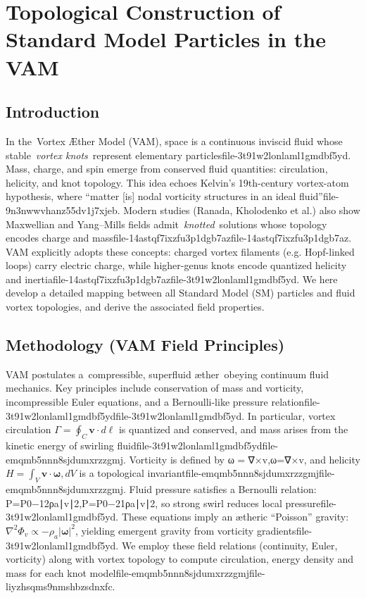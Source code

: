 \documentclass[a4paper,12pt]{article}
\begin{document}
\chapter*{Topological Construction of Standard Model Particles in the VAM}
\section*{Introduction}
In the Vortex Æther Model (VAM), space is a continuous inviscid fluid whose stable \textit{vortex knots} represent elementary particlesfile-3t91w2lonlaml1gmdbf5yd. Mass, charge, and spin emerge from conserved fluid quantities: circulation, helicity, and knot topology. This idea echoes Kelvin’s 19th-century vortex-atom hypothesis, where “matter [is] nodal vorticity structures in an ideal fluid”file-9n3nwwvhanz55dv1j7xjeb. Modern studies (Ranada, Kholodenko et al.) also show Maxwellian and Yang–Mills fields admit \textit{knotted} solutions whose topology encodes charge and massfile-14astqf7ixzfu3p1dgb7azfile-14astqf7ixzfu3p1dgb7az. VAM explicitly adopts these concepts: charged vortex filaments (e.g. Hopf-linked loops) carry electric charge, while higher-genus knots encode quantized helicity and inertiafile-14astqf7ixzfu3p1dgb7azfile-3t91w2lonlaml1gmdbf5yd. We here develop a detailed mapping between all Standard Model (SM) particles and fluid vortex topologies, and derive the associated field properties.

\section*{Methodology (VAM Field Principles)}
VAM postulates a compressible, superfluid æther obeying continuum fluid mechanics. Key principles include conservation of mass and vorticity, incompressible Euler equations, and a Bernoulli-like pressure relationfile-3t91w2lonlaml1gmdbf5ydfile-3t91w2lonlaml1gmdbf5yd. In particular, vortex circulation $\Gamma=\oint_C\mathbf{v}\cdot d\boldsymbol{\ell}$ is quantized and conserved, and mass arises from the kinetic energy of swirling fluidfile-3t91w2lonlaml1gmdbf5ydfile-emqmb5nnn8sjdumxrzzgmj. Vorticity is defined by
ω  =  ∇×v,ω=∇×v,
and helicity $H=\int_V \mathbf{v}\cdot\boldsymbol{\omega},dV$ is a topological invariantfile-emqmb5nnn8sjdumxrzzgmjfile-emqmb5nnn8sjdumxrzzgmj. Fluid pressure satisfies a Bernoulli relation:
P=P0−12ρa∣v∣2,P=P0​−21​ρa​∣v∣2,
so strong swirl reduces local pressurefile-3t91w2lonlaml1gmdbf5yd. These equations imply an ætheric “Poisson” gravity: $\nabla^2\Phi_v \propto -\rho_a|\boldsymbol{\omega}|^2$, yielding emergent gravity from vorticity gradientsfile-3t91w2lonlaml1gmdbf5yd. We employ these field relations (continuity, Euler, vorticity) along with vortex topology to compute circulation, energy density and mass for each knot modelfile-emqmb5nnn8sjdumxrzzgmjfile-liyzhsqms9nmshbzsdnxfc.
\end{document}
